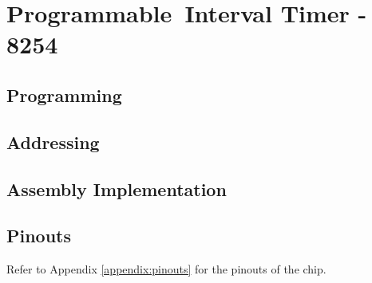 \section{Programmable Interval Timer - 8254}

    \subsection{Programming}

    \subsection{Addressing}

    \subsection{Assembly Implementation}

    \subsection{Pinouts}
    Refer to Appendix \ref{appendix:pinouts} for the pinouts of the chip.
